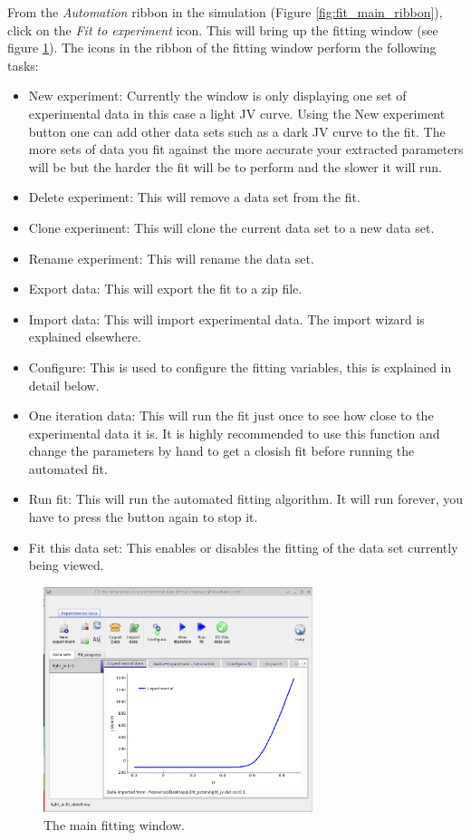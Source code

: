 From the \emph{Automation} ribbon in the simulation (Figure \ref{fig:fit_main_ribbon}), click on the \emph{Fit to experiment} icon. This will bring up the fitting window (see figure \ref{fig:fit_window_first_open}).  The icons in the ribbon of the fitting window perform the following tasks:

\begin{itemize}
  \item New experiment: Currently the window is only displaying one set of experimental data in this case a light JV curve. Using the New experiment button one can add other data sets such as a dark JV curve to the fit. The more sets of data you fit against the more accurate your extracted parameters will be but the harder the fit will be to perform and the slower it will run.
  \item Delete experiment: This will remove a data set from the fit.
  \item Clone experiment: This will clone the current data set to a new data set.
  \item Rename experiment: This will rename the data set.
  \item Export data: This will export the fit to a zip file.
  \item Import data: This will import experimental data. The import wizard is explained elsewhere.
  \item Configure: This is used to configure the fitting variables, this is explained in detail below.
  \item One iteration data: This will run the fit just once to see how close to the experimental data it is. It is highly recommended to use this function and change the parameters by hand to get a closish fit before running the automated fit.
  \item Run fit: This will run the automated fitting algorithm. It will run forever, you have to press the button again to stop it.
  \item Fit this data set: This enables or disables the fitting of the data set currently being viewed.
\end{itemize}


\begin{figure}[H]
\centering
\includegraphics[width=0.7\textwidth]{./images/fit/fit_window_first_open.png}
\caption{The main fitting window.}
\label{fig:fit_window_first_open}
\end{figure}


